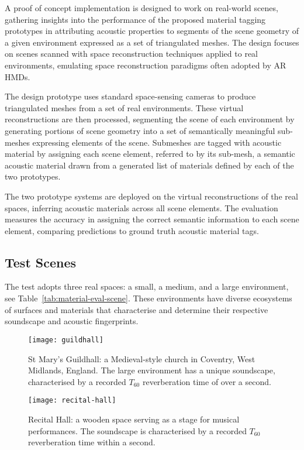 A proof of concept implementation is designed to work on real-world scenes, gathering insights into the performance of the proposed material tagging prototypes in attributing acoustic properties to segments of the scene geometry of a given environment expressed as a set of triangulated meshes. The design focuses on scenes scanned with space reconstruction techniques applied to real environments, emulating space reconstruction paradigms often adopted by AR HMDs.\par
The design prototype uses standard space-sensing cameras to produce triangulated meshes from a set of real environments. These virtual reconstructions are then processed, segmenting the scene of each environment by generating portions of scene geometry into a set of semantically meaningful sub-meshes expressing elements of the scene. Submeshes are tagged with acoustic material by assigning each scene element, referred to by its sub-mesh, a semantic acoustic material drawn from a generated list of materials defined by each of the two prototypes.\par
The two prototype systems are deployed on the virtual reconstructions of the real spaces, inferring acoustic materials across all scene elements. The evaluation measures the accuracy in assigning the correct semantic information to each scene element, comparing predictions to ground truth acoustic material tags.

\subsection{Test Scenes}
The test adopts three real spaces: a small, a medium, and a large environment, see Table~\ref{tab:material-eval-scene}. These environments have diverse ecosystems of surfaces and materials that characterise and determine their respective soundscape and acoustic fingerprints.

\begin{figure}[htbp]
    \centering
    \texttt{[image: guildhall]}
    \caption{St Mary's Guildhall: a Medieval-style church in Coventry, West Midlands, England. The large environment has a unique soundscape, characterised by a recorded $T_{60}$ reverberation time of over a second.}
    \label{fig:guildhall-iso-render}
\end{figure}

\begin{figure}[htbp]
    \centering
    \texttt{[image: recital-hall]}
    \caption{Recital Hall: a wooden space serving as a stage for musical performances. The soundscape is characterised by a recorded $T_{60}$ reverberation time within a second.}
    \label{fig:conservatoire-iso-render}
\end{figure}

